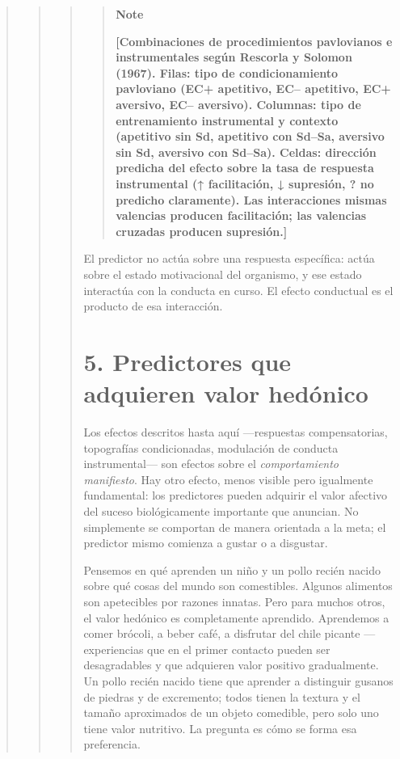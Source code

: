 \documentclass[
  letterpaper,
  DIV=11,
  numbers=noendperiod]{scrreprt}
\begin{document}
\begin{tcolorbox}[enhanced jigsaw, arc=.35mm, bottomrule=.15mm, breakable, colback=white, colframe=quarto-callout-note-color-frame, left=2mm, leftrule=.75mm, opacityback=0, rightrule=.15mm, toprule=.15mm]
\begin{quote}
\begin{quote}
\begin{quote}
\begin{quote}
\textbf{Note}

\textbf{{[}Combinaciones de procedimientos pavlovianos e instrumentales
según Rescorla y Solomon (1967). Filas: tipo de condicionamiento
pavloviano (EC+ apetitivo, EC-- apetitivo, EC+ aversivo, EC-- aversivo).
Columnas: tipo de entrenamiento instrumental y contexto (apetitivo sin
Sd, apetitivo con Sd--Sa, aversivo sin Sd, aversivo con Sd--Sa). Celdas:
dirección predicha del efecto sobre la tasa de respuesta instrumental (↑
facilitación, ↓ supresión, ? no predicho claramente). Las interacciones
mismas valencias producen facilitación; las valencias cruzadas producen
supresión.{]}}
\end{quote}

El predictor no actúa sobre una respuesta específica: actúa sobre el
estado motivacional del organismo, y ese estado interactúa con la
conducta en curso. El efecto conductual es el producto de esa
interacción.

\mbox{}%
\section{5. Predictores que adquieren valor
hedónico}\label{predictores-que-adquieren-valor-heduxf3nico}

Los efectos descritos hasta aquí ---respuestas compensatorias,
topografías condicionadas, modulación de conducta instrumental--- son
efectos sobre el \emph{comportamiento manifiesto}. Hay otro efecto,
menos visible pero igualmente fundamental: los predictores pueden
adquirir el valor afectivo del suceso biológicamente importante que
anuncian. No simplemente se comportan de manera orientada a la meta; el
predictor mismo comienza a gustar o a disgustar.

Pensemos en qué aprenden un niño y un pollo recién nacido sobre qué
cosas del mundo son comestibles. Algunos alimentos son apetecibles por
razones innatas. Pero para muchos otros, el valor hedónico es
completamente aprendido. Aprendemos a comer brócoli, a beber café, a
disfrutar del chile picante --- experiencias que en el primer contacto
pueden ser desagradables y que adquieren valor positivo gradualmente. Un
pollo recién nacido tiene que aprender a distinguir gusanos de piedras y
de excremento; todos tienen la textura y el tamaño aproximados de un
objeto comedible, pero solo uno tiene valor nutritivo. La pregunta es
cómo se forma esa preferencia.


\end{quote}
\end{quote}
\end{quote}
\end{tcolorbox}
\end{document}
